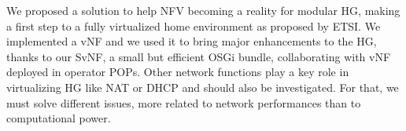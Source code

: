 We proposed a solution to help NFV becoming a reality for modular HG, making a first step to a fully virtualized home environment as proposed by ETSI.
We implemented a vNF and we used it to bring major enhancements to the HG, thanks to our SvNF, a small but efficient OSGi bundle, collaborating with vNF deployed in operator POPs.
Other network functions play a key role in virtualizing HG like NAT or DHCP and should also be investigated.
For that, we must solve different issues, more related to network performances than to computational power. 



